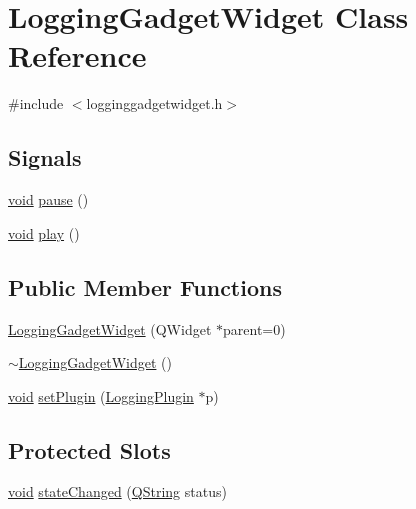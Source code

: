 \hypertarget{class_logging_gadget_widget}{\section{\-Logging\-Gadget\-Widget \-Class \-Reference}
\label{class_logging_gadget_widget}
}


{\ttfamily \#include $<$logginggadgetwidget.\-h$>$}

\subsection*{\-Signals}
\begin{DoxyCompactItemize}
\item 
\hyperlink{group___u_a_v_objects_plugin_ga444cf2ff3f0ecbe028adce838d373f5c}{void} \hyperlink{group___g_c_s_control_gadget_plugin_gab36252efc1545bad1c46720b2fd92a22}{pause} ()
\item 
\hyperlink{group___u_a_v_objects_plugin_ga444cf2ff3f0ecbe028adce838d373f5c}{void} \hyperlink{group___g_c_s_control_gadget_plugin_gabd0c6db2a3fecf6afb525d40bc12431c}{play} ()
\end{DoxyCompactItemize}
\subsection*{\-Public \-Member \-Functions}
\begin{DoxyCompactItemize}
\item 
\hyperlink{group___g_c_s_control_gadget_plugin_ga82895cf265acb40f6491abf90e3b018e}{\-Logging\-Gadget\-Widget} (\-Q\-Widget $\ast$parent=0)
\item 
\hyperlink{group___g_c_s_control_gadget_plugin_gafa54fcc426f5064c9706b1528834d6a0}{$\sim$\-Logging\-Gadget\-Widget} ()
\item 
\hyperlink{group___u_a_v_objects_plugin_ga444cf2ff3f0ecbe028adce838d373f5c}{void} \hyperlink{group___g_c_s_control_gadget_plugin_ga9ff08b035e0189200c2f5d2e2b234dac}{set\-Plugin} (\hyperlink{class_logging_plugin}{\-Logging\-Plugin} $\ast$p)
\end{DoxyCompactItemize}
\subsection*{\-Protected \-Slots}
\begin{DoxyCompactItemize}
\item 
\hyperlink{group___u_a_v_objects_plugin_ga444cf2ff3f0ecbe028adce838d373f5c}{void} \hyperlink{group___g_c_s_control_gadget_plugin_ga8d9370f949bfe6eec4f37676feb6de85}{state\-Changed} (\hyperlink{group___u_a_v_objects_plugin_gab9d252f49c333c94a72f97ce3105a32d}{\-Q\-String} status)
\end{DoxyCompactItemize}


